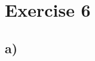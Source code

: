 \documentclass[11pt]{article}
\begin{document}
\newpage
\section*{Exercise 6}
\subsection*{a)}
\end{document}
